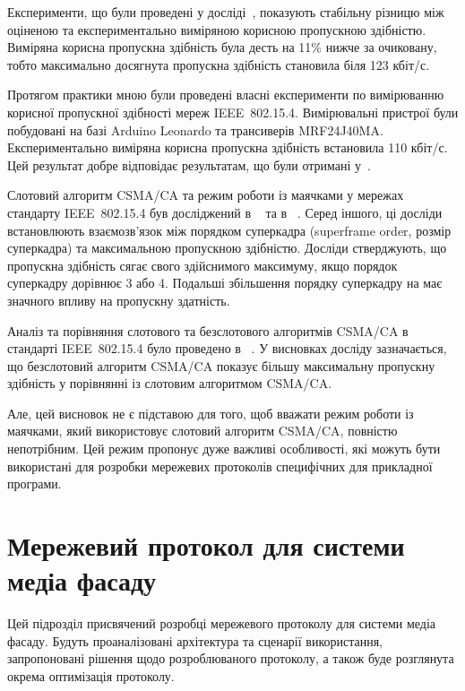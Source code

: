 \documentclass[a4paper,ukrainian,utf8,nocolumnsxix,floatsection,equationsection]{eskdtext}
\let\stdsection\section
\renewcommand\section{\clearpage\stdsection}
\newcommand{\iee}[0]{IEEE~802.15.4\xspace}
\newcommand{\csma}[0]{CSMA/CA\xspace}
\begin{document}
Експерименти, що були проведені у досліді~\cite{thoroughput:analysis:unslotted:ieee}, показують стабільну різницю між оціненою та експериментально виміряною корисною пропускною здібністю. Виміряна корисна пропускна здібність була десть на 11\% нижче за очиковану, тобто максимально досягнута пропускна здібність становила біля 123 кбіт/с.

Протягом практики мною були проведені власні експерименти по вимірюванню корисної пропускної здібності мереж \iee. Вимірювальні пристрої були побудовані на базі Arduino Leonardo та трансиверів MRF24J40MA. Експериментально виміряна корисна пропускна здібність встановила 110 кбіт/с. Цей результат добре відповідає результатам, що були отримані у~\cite{thoroughput:analysis:unslotted:ieee}.

Слотовий алгоритм \csma та режим роботи із маячками у мережах стандарту \iee був досліджений в ~\cite{simulation:study:slotted:ieee} та в ~\cite{gts:allocation:analysis}. Серед іншого, ці досліди встановлюють взаємозв'язок між порядком суперкадра (superframe order, розмір суперкадра) та максимальною пропускною здібністю. Досліди стверджують, що пропускна здібність сягає свого здійснимого максимуму, якщо порядок суперкадру дорівнює 3 або 4. Подальші збільшення порядку суперкадру на має значного впливу на пропускну здатність.

Аналіз та порівняння слотового та безслотового алгоритмів \csma в стандарті \iee було проведено в ~\cite{analysis:slotted:unslotted}. У висновках досліду зазначається, що безслотовий алгоритм \csma  показує більшу максимальну пропускну здібність у порівнянні із слотовим алгоритмом \csma.

Але, цей висновок не є підставою для того, щоб вважати режим роботи із маячками, який використовує слотовий алгоритм \csma, повністю непотрібним. Цей режим пропонує дуже важливі особливості, які можуть бути використані для розробки мережевих протоколів специфічних для прикладної програми.

\section{Мережевий протокол для системи медіа фасаду}
\label{sec:network:protocol:amf}


Цей підрозділ присвячений розробці мережевого протоколу для системи медіа фасаду. Будуть проаналізовані архітектура та сценарії використання, запропоновані рішення щодо розроблюваного протоколу, а також буде розглянута окрема оптимізація протоколу.
\end{document}
